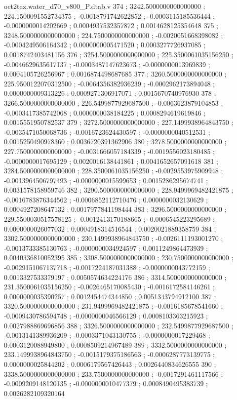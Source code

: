 \begin{filecontents}[overwrite]{oct2tex.water_d70_v800_P.dtab.v}
374 ; 3242.5000000000000000 ; 224.1500091552734375 ; -0.0018791742622852 ; -0.0003115185536444 ; -0.0000000014202669 ; 0.0004937532357872 ; 0.0014628125354648
375 ; 3248.5000000000000000 ; 224.7500000000000000 ; -0.0020051668398082 ; -0.0004249506164342 ; 0.0000000005471520 ; 0.0003277726937085 ; 0.0018742403481156
376 ; 3254.5000000000000000 ; 225.3500061035156250 ; -0.0046629635617137 ; -0.0003487147623673 ; -0.0000000013969839 ; 0.0004105726256967 ; 0.0016874498687685
377 ; 3260.5000000000000000 ; 225.9500122070312500 ; -0.0064356382936239 ; -0.0002962173894048 ; 0.0000000009313226 ; 0.0009271306917071 ; 0.0015670740976930
378 ; 3266.5000000000000000 ; 226.5499877929687500 ; -0.0063623879104853 ; -0.0003417385742068 ; 0.0000000038184225 ; 0.0008294619619846 ; 0.0015551950782537
379 ; 3272.5000000000000000 ; 227.1499938964843750 ; -0.0035471050068736 ; -0.0016723624430597 ; -0.0000000040512531 ; 0.0015250490978360 ; 0.0036720391362906
380 ; 3278.5000000000000000 ; 227.7500000000000000 ; -0.0031666057184339 ; -0.0019556023180485 ; -0.0000000017695129 ; 0.0020016138441861 ; 0.0041652657091618
381 ; 3284.5000000000000000 ; 228.3500061035156250 ; -0.0029553975909948 ; -0.0013964506797493 ; -0.0000000015599653 ; 0.0015286295674741 ; 0.0031578158959746
382 ; 3290.5000000000000000 ; 228.9499969482421875 ; -0.0016783876344562 ; -0.0006852112710476 ; 0.0000000032130629 ; 0.0004927208647132 ; 0.0017977841198444
383 ; 3296.5000000000000000 ; 229.5500030517578125 ; -0.0012413170188665 ; -0.0006545223295689 ; 0.0000000026077032 ; 0.0004918314516544 ; 0.0020021889358759
384 ; 3302.5000000000000000 ; 230.1499938964843750 ; -0.0026111193001270 ; -0.0013733385130763 ; -0.0000000034924597 ; 0.0011249864473939 ; 0.0040336810052395
385 ; 3308.5000000000000000 ; 230.7500000000000000 ; -0.0029151067137718 ; -0.0017224187031388 ; -0.0000000043772159 ; 0.0013327533379197 ; 0.0050574634224176
386 ; 3314.5000000000000000 ; 231.3500061035156250 ; -0.0026465170085430 ; -0.0016172584146261 ; 0.0000000035390257 ; 0.0012454474344850 ; 0.0051343794912100
387 ; 3320.5000000000000000 ; 231.9499969482421875 ; -0.0016185678541660 ; -0.0009430786594748 ; -0.0000000046566129 ; 0.0008103363215923 ; 0.0027988869696856
388 ; 3326.5000000000000000 ; 232.5499877929687500 ; -0.0013141389936209 ; -0.0003371043130755 ; -0.0000000017229468 ; 0.0003120088949800 ; 0.0008509214967489
389 ; 3332.5000000000000000 ; 233.1499938964843750 ; -0.0015179375186563 ; -0.0006287773139775 ; 0.0000000025844202 ; 0.0006179567426443 ; 0.0026440834626555
390 ; 3338.5000000000000000 ; 233.7500000000000000 ; -0.0017291461117566 ; -0.0009209148120135 ; -0.0000000010477379 ; 0.0008490495383739 ; 0.0026282109320164

\end{filecontents}
